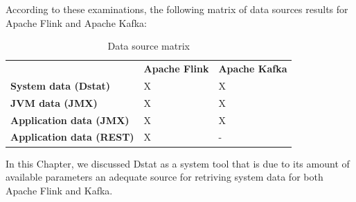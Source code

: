 According to these examinations, the following matrix of data sources results for Apache
Flink and Apache Kafka:
\begin{table}[H]
\begin{tabular}{lll}
 & \textbf{Apache Flink} & \textbf{Apache Kafka} \\
\textbf{System data (Dstat)} & X & X \\
\textbf{JVM data (JMX)} & X & X \\
\textbf{Application data (JMX)} & X & X \\
\textbf{Application data (REST)} & X & - \\
\end{tabular}
\caption{Data source matrix}
\label{data-source-matrix}
\end{table}




In this Chapter, we discussed Dstat as a system tool that is due to its amount of available parameters
an adequate source for retriving system data for both Apache Flink and Kafka.
